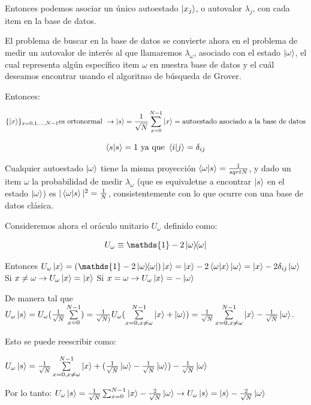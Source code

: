 \documentclass[11pt, spanish]{report}
\begin{document}
Entonces podemos asociar un único autoestado $\ket{x_j}$, o autovalor
$\lambda_j$, con cada item en la base de datos.

El problema de buscar en la base de datos se convierte ahora en el problema de
medir un autovalor de interés al que llamaremos $\lambda_\omega$, asociado con
el estado $\ket{\omega}$, el cual representa algún específico item $\omega$ en
nuestra base de datos y el cuál deseamos encontrar usando el algoritmo de
búsqueda de Grover.

Entonces:

$$\{\ket{x}\}_{x=0,1,...,N-1} \text{es ortonormal }\rightarrow \ket{s} =
\frac{1}{\sqrt{N}} \sum\limits_{x=0}^{N-1} \ket{x} = \text{autoestado asociado a
  la base de datos}$$

$$\braket{s}{s} = 1 \text{ ya que } \braket{i}{j} = \delta_{ij}$$

Cualquier autoestado $\ket{\omega}$ tiene la misma proyección
$\braket{\omega}{s} = \frac{1}{sqrt{N}}$, y dado un item $\omega$ la
probabilidad de medir $\lambda_\omega$ (que es equivaletne a encontrar $\ket{s}$
en el estado $\ket{\omega}$) es $|\braket{\omega}{s}|^2 = \frac{1}{N}$,
consistentemente con lo que ocurre con una base de datos clásica.

Consideremos ahora el oráculo unitario $U_\omega$ definido como:

$$U_\omega \equiv \mathds{1} - 2\ketbra{\omega}{\omega}$$

Entonces $U_\omega \ket{x} = (\mathds{1} - 2\ketbra{\omega}{\omega}) \ket{x} =
\ket{x} - 2 \braket{\omega}{x} \ket{\omega} = \ket{x} - 2 \delta_{ij} \ket{\omega}$
 Si $x \neq \omega \rightarrow U_\omega \ket{x} = \ket{x}$ 
 Si $x = \omega \rightarrow U_\omega \ket{x} = -\ket{\omega}$ 

De manera tal que $U_\omega \ket{s} = U_\omega (\frac{1}{\sqrt{N}}
\sum\limits_{x = 0}^{N-1}) = \frac{1}{\sqrt{N})} U_\omega (\sum\limits_{x=0,
  x\neq\omega}^{N-1} \ket{x} + \ket{\omega}) =
\frac{1}{\sqrt{N}}\sum\limits_{x=0, x\neq\omega}^{N-1} \ket{x} -
\frac{1}{\sqrt{N}} \ket{\omega}$.

Esto se puede reescribir como:

$U_\omega \ket{s} = \frac{1}{\sqrt{N}} \sum\limits_{x=0, x\neq\omega}^{N-1}
\ket{x} + (\frac{1}{\sqrt{N}} \ket{\omega} - \frac{1}{\sqrt{N}} \ket{\omega} )- \frac{1}{\sqrt{N}} \ket{\omega} $

Por lo tanto: $U_\omega \ket{s} = \frac{1}{\sqrt{N}} \sum_{x=0}^{N-1} \ket{x} -
\frac{2}{\sqrt{N}} \ket{\omega} \rightarrow U_\omega \ket{s} = \ket{s} -
\frac{2}{\sqrt{N}} \ket{\omega}$
\end{document}
